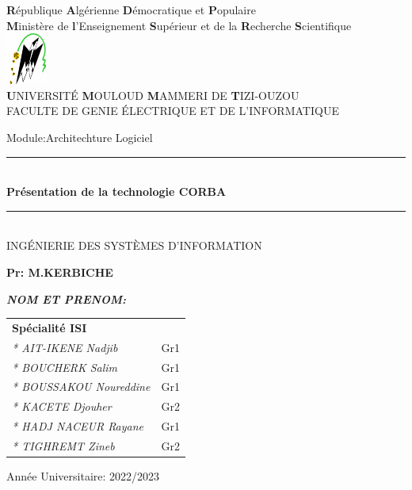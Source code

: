 \thispagestyle{empty}

\begin{center} 

\large \textbf{R}épublique \textbf{A}lgérienne \textbf{D}émocratique et \textbf{P}opulaire\\
\textbf{M}inistère de\textbf{ l}’Enseignement \textbf{S}upérieur et de la\textbf{ R}echerche \textbf{S}cientifique\\
\includegraphics[width=0.1\textwidth]{pdg/ummto.png}\\
\textbf{U}NIVERSITÉ \textbf{M}OULOUD \textbf{M}AMMERI DE \textbf{T}IZI-OUZOU\\ \vspace*{0.3cm}
FACULTE DE GENIE ÉLECTRIQUE ET DE L’INFORMATIQUE\\\vfill


\end{center}


\begin{center}
    \huge Module:Architechture Logiciel\normalsize\\
 
    \rule{0.90\textwidth}{2pt}\\
    \LARGE \textbf
    {Présentation de la technologie \textbf{CORBA}}\\
    \normalsize
    \rule{0.90\textwidth}{2pt}\\
    \large INGÉNIERIE DES SYSTÈMES D'INFORMATION \\
    \vfill
    \begin{flushright}
     \large \textbf {Pr: M.KERBICHE} \\
    \end{flushright}
  \vfill
 
 
\begin{flushleft}   
 \large\emph{\textbf{NOM ET PRENOM:}}\\ \vspace*{0.2cm}
 \begin{tabular}{ll}
  \hline \hline
    \textbf{ Spécialité ISI} \\   
      \emph{* AIT-IKENE Nadjib}    & Gr1 \\ 
      \emph{* BOUCHERK Salim}   &  Gr1\\
      \emph{* BOUSSAKOU Noureddine} &Gr1\\
      \emph{* KACETE Djouher} &Gr2 \\
      \emph{* HADJ NACEUR Rayane} &  Gr1\\
      \emph{* TIGHREMT Zineb} & Gr2\\
   \hline \hline
\end{tabular}
\end{flushleft}
\vfill 

\begin{flushright}
\large Année Universitaire: 2022/2023\\
\end{flushright}
   
\end{center}
    
%